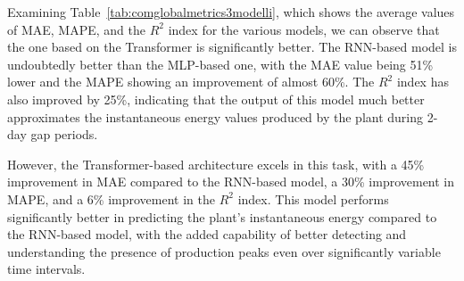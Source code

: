 \begin{figure}[H]
	\label{fig:cmperrs}
\end{figure}

Examining Table~\ref{tab:comglobalmetrics3modelli}, which shows the average values of MAE, MAPE, and the $R^2$ index for the various models, we can observe that the one based on the Transformer is significantly better. The RNN-based model is undoubtedly better than the MLP-based one, with the MAE value being 51\% lower and the MAPE showing an improvement of almost 60\%. The $R^2$ index has also improved by 25\%, indicating that the output of this model much better approximates the instantaneous energy values produced by the plant during 2-day gap periods.

However, the Transformer-based architecture excels in this task, with a 45\% improvement in MAE compared to the RNN-based model, a 30\% improvement in MAPE, and a 6\% improvement in the $R^2$ index. This model performs significantly better in predicting the plant's instantaneous energy compared to the RNN-based model, with the added capability of better detecting and understanding the presence of production peaks even over significantly variable time intervals.

%

